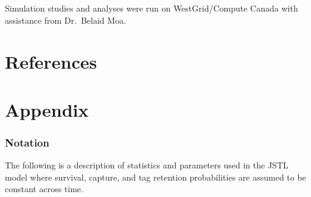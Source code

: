 \documentclass[]{article}
\begin{document}
Simulation studies and analyses were run on WestGrid/Compute Canada with
assistance from Dr.~Belaid Moa.

\section{References}\label{references}




\bigskip





\section{Appendix}

\subsubsection{Notation}\label{notation}

The following is a description of statistics and parameters used in the
JSTL model where survival, capture, and tag retention probabilities are
assumed to be constant across time.
\end{document}
